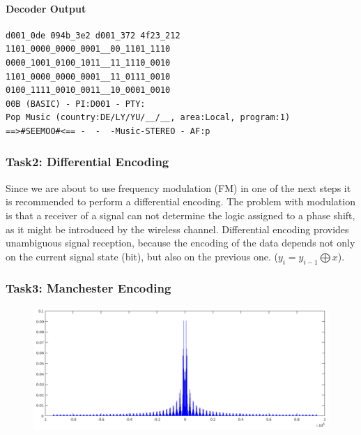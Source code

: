 \documentclass[sigconf]{acmart}
\begin{document}
\hypertarget{Decoderux20Output}{%
\paragraph{Decoder Output}\label{Decoderux20Output}}

\begin{verbatim}
d001_0de 094b_3e2 d001_372 4f23_212
1101_0000_0000_0001__00_1101_1110
0000_1001_0100_1011__11_1110_0010
1101_0000_0000_0001__11_0111_0010
0100_1111_0010_0011__10_0001_0010
00B (BASIC) - PI:D001 - PTY:
Pop Music (country:DE/LY/YU/__/__, area:Local, program:1)
==>#SEEMOO#<== -  -  -Music-STEREO - AF:p
\end{verbatim}

\hypertarget{Task2:ux20Differentialux20Encoding}{%
\subsubsection{Task2: Differential
Encoding}\label{Task2:ux20Differentialux20Encoding}}

Since we are about to use frequency modulation (FM) in one of the next
steps it is recommended to perform a differential encoding. The problem
with modulation is that a receiver of a signal can not determine the
logic assigned to a phase shift, as it might be introduced by the
wireless channel. Differential encoding provides unambiguous signal
reception, because the encoding of the data depends not only on the
current signal state (bit), but also on the previous one.
(\(y_i = y_{i-1} \bigoplus x\)).


\hypertarget{Task3:ux20Manchesterux20Encoding}{%
\subsubsection{Task3: Manchester
Encoding}\label{Task3:ux20Manchesterux20Encoding}}

\begin{figure}[tb!]
	\hfill
	\includegraphics[width=1\linewidth]{rds_plot.png}
	\caption{}
	\label{fig:rds_plot}
\end{figure}
\end{document}
